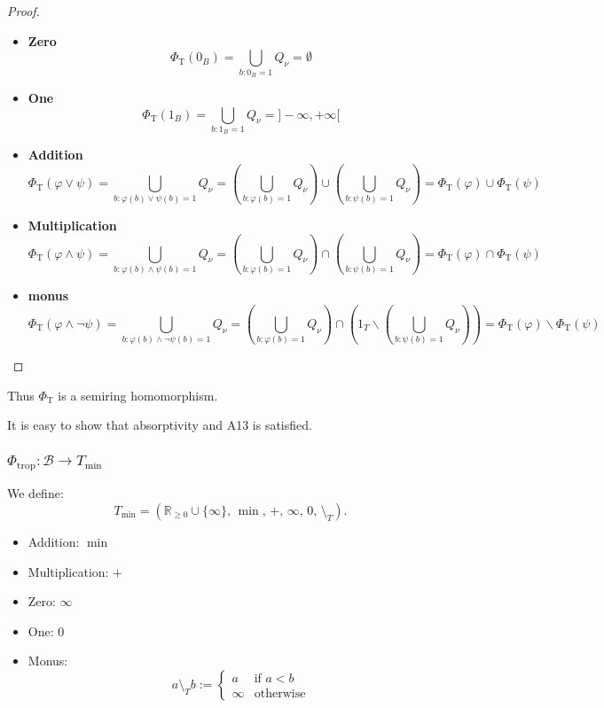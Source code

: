 \begin{proof}
\begin{itemize}
\item \textbf{Zero}
$$
\Phi_{\mathrm{T}}(0_B) = \bigcup_{b:0_B=1} Q_{\nu} = \emptyset
$$

\item
\textbf{One}
$$
\Phi_{\mathrm{T}}(1_B) = \bigcup_{b:1_B=1} Q_{\nu} = ]-\infty, +\infty[
$$
\item
\textbf{Addition}
$$
\Phi_{\mathrm{T}}(\varphi \lor \psi)
= \bigcup_{b: \varphi(b) \lor \psi(b) = 1} Q_{\nu}
= \left(\bigcup_{b: \varphi(b) = 1} Q_{\nu}\right) \cup \left(\bigcup_{b: \psi(b) = 1} Q_{\nu}\right)
= \Phi_{\mathrm{T}}(\varphi) \cup \Phi_{\mathrm{T}}(\psi)
$$
\item
\textbf{Multiplication}
$$
\Phi_{\mathrm{T}}(\varphi \land \psi)
= \bigcup_{b: \varphi(b) \land \psi(b) = 1} Q_{\nu}
= \left(\bigcup_{b: \varphi(b) = 1} Q_{\nu}\right) \cap \left(\bigcup_{b: \psi(b) = 1} Q_{\nu}\right)
= \Phi_{\mathrm{T}}(\varphi) \cap \Phi_{\mathrm{T}}(\psi)
$$
\item
\textbf{monus}
$$
\Phi_{\mathrm{T}}(\varphi \land \neg \psi)
= \bigcup_{b: \varphi(b) \land \neg \psi(b) = 1} Q_{\nu}
= \left(\bigcup_{b: \varphi(b) = 1} Q_{\nu}\right) \cap \left(1_T \backslash \left(\bigcup_{b: \psi(b) = 1} Q_{\nu}\right)\right)
= \Phi_{\mathrm{T}}(\varphi) \backslash \Phi_{\mathrm{T}}(\psi)
$$
    

\end{itemize}

\end{proof}

Thus $\Phi_{\mathrm{T}}$ is a semiring homomorphism.

It is easy to show that absorptivity and A13 is satisfied.

\subsubsection{$\Phi_{\mathrm{trop}}: \mathcal{B} \to T_{\min}$}

We define:
$$
T_{\min} = (\mathbb{R}_{\ge 0} \cup \{\infty\},\,\min,\,+,\,\infty,\,0,\,\setminus_T).
$$
\begin{itemize}
    \item Addition: \(\min\)
    \item Multiplication: \(+\)
    \item Zero: \(\infty\)
    \item One: \(0\)
    \item Monus:
    \[
    a \setminus_T b :=
    \begin{cases}
        a & \text{if } a < b \\
        \infty & \text{otherwise}
    \end{cases}
    \]
\end{itemize}



